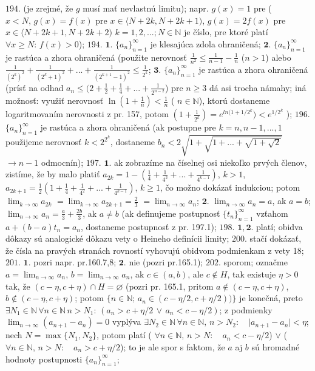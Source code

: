 $\boxed{194.}$ (je zrejmé, že $g$ musí mať nevlastnú limitu); napr. $g(x)=1$ pre ($x<N, \, g(x)=f(x)$ pre $x \in \langle N+2k, N+2k+1 )$, $g(x)=2f(x)$ pre $x \in \langle N+2k+1, N+2k+2 )$ $k=1,2,...;N \in \mathbb{N}$ je číslo, pre ktoré platí $\forall x\geq N :\, f(x)>0$);
$\boxed{194.}$  $\boldsymbol{1.}$ $\lbrace a_{n} \rbrace _{n=1} ^{\infty}$ je klesajúca zdola ohraničená;
$\boldsymbol{2.}$ $\lbrace a_{n} \rbrace _{n=1} ^{\infty}$ je rastúca  a zhora ohraničená (použite nerovnosť  $\frac{1}{n^{2}}\leq \frac{1}{n-1}- \frac{1}{n}$  ($n>1$) alebo  $\frac{1}{(2^{k})^{2}}+\frac{1}{(2^{k}+1)^{2}}+...+\frac{1}{(2^{k+1}-1)^{2}}\leq \frac{1}{2^{k}}$;
$\boldsymbol{3.}$ $\lbrace a_{n} \rbrace _{n=1} ^{\infty}$ je rastúca  a zhora ohraničená (prísť na  odhad $a_{n}\leq (2+ \frac{1}{2}+ \frac{1}{4}+...+ \frac{1}{2^{n-2}} $) pre $n\geq 3 $ dá asi trocha námahy; iná možnosť: využiť nerovnosť $\ln (1+ \frac{1}{n})< \frac{1}{n} $ ( $ n \in \mathbb{N} $), ktorú dostaneme logaritmovaním nerovnosti z pr. 157, potom $(1+\frac{1}{2^{k}})=e^{ln(1+1/2^{k}})< e^{1/2^{k}}  $ );
$\boxed{196.}$   $\lbrace a_{n} \rbrace _{n=1} ^{\infty}$ je rastúca  a zhora ohraničená (ak postupne pre $k=n,n-1,...,1 $ použijeme nerovnosť $ k< 2^{2^{k}}$, dostaneme  $b_{n}< 2\sqrt{1+\sqrt{1+...+\sqrt{1+\sqrt{2}}}}   $  $\rightarrow n-1 $ odmocnín);
$\boxed{197.}$  $\boldsymbol{1.}$ ak zobrazíme na číselnej osi niekoľko prvých členov, zistíme, že by malo platiť $a_{2k}=1-(\frac{1}{4} +\frac{1}{4^{2}}+...+\frac{1}{4^{k-1}})$,  $ k>1  $,  $a_{2k+1}=\frac{1}{2}(1+\frac{1}{4} +\frac{1}{4^{2}}+...+\frac{1}{4^{k-1}}) $,  $ k\geq 1  $, čo možno dokázať indukciou; potom  $ \lim_{k \to \infty}a_{2k}  $ $= \lim_{k \to \infty}a_{2k+1}  = \frac{2}{3}$ $= \lim_{n \to \infty}a_n  $;
$\boldsymbol{2.}$ $\lim_{n \to \infty}a_n =a$, ak $a=b$; $ \lim_{n \to \infty}a_n =\frac{a}{3}+ \frac{2b}{3} $, ak $a \ne b $ (ak definujeme postupnosť $\lbrace t_n \rbrace_{n=1}^{\infty}$ vzťahom $a+(b-a)t_{n}=a_{n}$, dostaneme postupnosť z pr. 197.1);
$\boxed{198.}$  $\boldsymbol{1,2.}$ platí; obidva dôkazy sú analogické dôkazu vety o Heineho definícii limity;
$\boxed{200.}$ stačí dokázať, že čísla na pravých stranách rovností vyhovujú obidvom podmienkam z vety 18;
$\boxed{201.}$  $\boldsymbol{1.}$ pozri napr. pr.160.7,8;
$\boldsymbol{2.}$ nie (pozri pr.165.1);
$\boxed{202.}$ sporom; označme $a=\lim_{n \to \infty}a_n$, $b=\lim_{n \to \infty}a_n$, ak $c \in (a,b)$, ale $c \notin H$, tak existuje $\eta > 0 $ tak, že $(c-\eta ,c+\eta) \cap H=\varnothing $ (pozri pr. 165.1, pritom $a\notin (c-\eta ,c+\eta)$, $b\notin (c-\eta ,c+\eta)$; potom $\lbrace n \in \mathbb{N};\, a_{n }\in (c-\eta /2 ,c+\eta /2)) \rbrace$ je konečná, preto $\exists N_{1} \in \mathbb{N}\, \forall n\in \mathbb{N}\,  n > N_{1}: \, (a_{n} > c+ \eta /2 \, \lor \, a_{n} < c- \eta /2 )$; z podmienky  $\lim_{n \to \infty} (a_{n+1} - a_{n})=0$ vyplýva $\exists N_{2} \in \mathbb{N}\,  \forall n \in \mathbb{N},\, n >N_{2}: \quad \vert a_{n+1} - a_{n} \vert < \eta $; nech $N= \max \lbrace N_{1}, N_{2} \rbrace $, potom platí ( $\forall n \in \mathbb{N},\, n >N: \quad a_{n} < c-\eta /2 $) $\lor $ ( $\forall n \in \mathbb{N},\, n >N: \quad a_{n} > c+ \eta /2 $); to je ale spor s faktom, že $a$  aj   $b$ sú hromadné hodnoty postupnosti $\lbrace a_{n} \rbrace _{n=1} ^{\infty} $;
